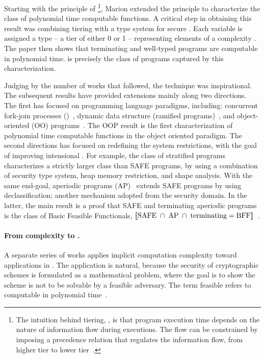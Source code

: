 Starting with the principle of {\emph{}}\footnote{
The intuition behind tiering, \aka {}, is that program execution time depends on the nature of information flow during executions.
The flow can be constrained by imposing a precedence relation that regulates the information flow,
\eg from higher tier to lower tier~\cite{leivant1995, leivant2013}.},
Marion extended the principle to characterize the class of polynomial time computable functions.
A critical step in obtaining this result was combining tiering with a type system for secure .
Each variable is assigned a type -- a {tier} of either 0 or 1 -- representing elements of a complexity .
The paper then shows that terminating and well-typed programs are computable in polynomial time.
 is precisely the class of programs captured by this characterization.

Judging by the number of works that followed, the technique was inspirational.
The subsequent results have provided extensions mainly along two directions.
The first has focused on programming language paradigms, including: 
concurrent fork-join processes ()~\cite{hainry2013},
dynamic data structure (ramified programs)~\cite{leivant2013}, and
{object-oriented (OO) programs}~\cite{hainry2015}.
The OOP result is the first characterization of polynomial time computable functions in the object oriented paradigm.
The second directions has focused on redefining the system restrictions, with the goal of improving intensional .
For example, the class of stratified programs~\cite{hainry2023} characterizes a strictly larger class than SAFE programs,
by using a combination of {security type system}, heap memory restriction, and shape analysis.
With the same end-goal, aperiodic programs (AP)~\cite{hainry2024} extends SAFE programs by using declassification;
another mechanism adopted from the security domain.
In the latter, the main result is a proof that SAFE and terminating aperiodic programs is the class of Basic Feasible Functionals, \ie \(\llbracket\text{SAFE}\;\cap\;\text{AP}\;\cap\;\text{terminating} = \text{BFF}\rrbracket\)~\cite{hainry2020,hainry2024}.

\paragraph*{From complexity to .}
A separate series of works applies implicit computation complexity toward applications in .
The application is natural, because the security of cryptographic schemes is formulated as a mathematical problem, where the goal is to show the scheme is not to be solvable by a feasible adversary.
The term feasible refers to computable in polynomial time~\cite{feree2018}.

